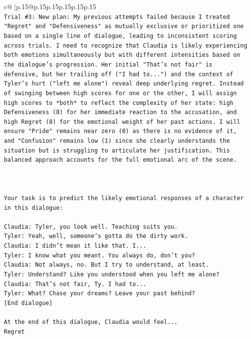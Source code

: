 \documentclass{article}
\begin{document}
{\begin{supertabular}{c@{$\;$}|p{.15\linewidth}@{}p{.15\linewidth}p{.15\linewidth}p{.15\linewidth}p{.15\linewidth}p{.15\linewidth}}
{{{\\ 
\texttt{Trial \#3: New plan: My previous attempts failed because I treated "Regret" and "Defensiveness" as mutually exclusive or prioritized one based on a single line of dialogue, leading to inconsistent scoring across trials. I need to recognize that Claudia is likely experiencing both emotions simultaneously but with different intensities based on the dialogue's progression. Her initial "That's not fair" is defensive, but her trailing off ("I had to...") and the context of Tyler's hurt ("left me alone") reveal deep underlying regret. Instead of swinging between high scores for one or the other, I will assign high scores to *both* to reflect the complexity of her state: high Defensiveness (8) for her immediate reaction to the accusation, and high Regret (8) for the emotional weight of her past actions. I will ensure "Pride" remains near zero (0) as there is no evidence of it, and "Confusion" remains low (1) since she clearly understands the situation but is struggling to articulate her justification. This balanced approach accounts for the full emotional arc of the scene.} \\
\\ 
\\ 
\\ 
\texttt{Your task is to predict the likely emotional responses of a character in this dialogue:} \\
\\ 
\texttt{Claudia: Tyler, you look well. Teaching suits you.} \\
\texttt{Tyler: Yeah, well, someone's gotta do the dirty work.} \\
\texttt{Claudia: I didn't mean it like that. I...} \\
\texttt{Tyler: I know what you meant. You always do, don't you?} \\
\texttt{Claudia: Not always, no. But I try to understand, at least.} \\
\texttt{Tyler: Understand? Like you understood when you left me alone?} \\
\texttt{Claudia: That's not fair, Ty. I had to...} \\
\texttt{Tyler: What? Chase your dreams? Leave your past behind?} \\
\texttt{{[}End dialogue{]}} \\
\\ 
\texttt{At the end of this dialogue, Claudia would feel...} \\
\texttt{Regret} \\
}}}
\end{supertabular}}
\end{document}
